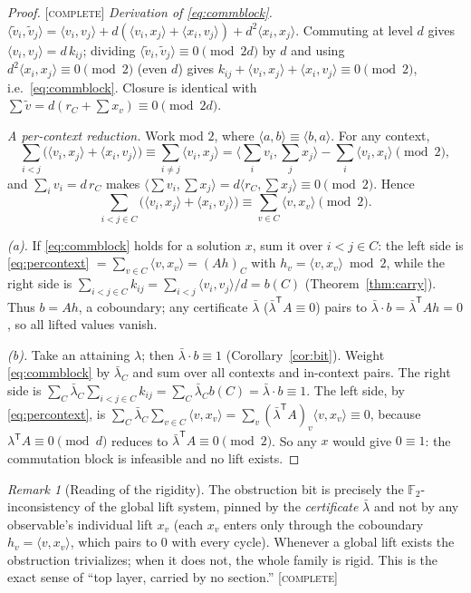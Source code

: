 \documentclass[11pt]{article}
\theoremstyle{definition}
\theoremstyle{remark}
\newtheorem{remark}[theorem]{Remark}
\newcommand{\F}{\mathbb{F}}
\newcommand{\ip}[2]{\langle #1,#2\rangle}
\newcommand{\CO}{\textnormal{\textsc{[complete]}}}
\begin{document}
\begin{proof}
\CO{} \emph{Derivation of \eqref{eq:commblock}.} $\ip{\tilde v_i}{\tilde v_j}=\ip{v_i}{v_j}+d(\ip{v_i}
{x_j}+\ip{x_i}{v_j})+d^2\ip{x_i}{x_j}$. Commuting at level $d$ gives $\ip{v_i}{v_j}=d\,k_{ij}$;
dividing $\ip{\tilde v_i}{\tilde v_j}\equiv0\pmod{2d}$ by $d$ and using $d^2\ip{x_i}{x_j}\equiv0
\pmod{2}$ (even $d$) gives $k_{ij}+\ip{v_i}{x_j}+\ip{x_i}{v_j}\equiv0\pmod2$, i.e.\
\eqref{eq:commblock}. Closure is identical with $\sum\tilde v=d(r_C+\sum x_v)\equiv0\pmod{2d}$.

\emph{A per-context reduction.} Work mod $2$, where $\ip{a}{b}\equiv\ip{b}{a}$. For any context,
\[
\sum_{i<j}\bigl(\ip{v_i}{x_j}+\ip{x_i}{v_j}\bigr)\equiv\sum_{i\ne j}\ip{v_i}{x_j}
=\ip{\textstyle\sum_iv_i}{\textstyle\sum_jx_j}-\sum_i\ip{v_i}{x_i}\pmod2 ,
\]
and $\sum_iv_i=d\,r_C$ makes $\ip{\sum v_i}{\sum x_j}=d\ip{r_C}{\sum x_j}\equiv0\pmod2$. Hence
\begin{equation}\label{eq:percontext}
\sum_{i<j\in C}\bigl(\ip{v_i}{x_j}+\ip{x_i}{v_j}\bigr)\equiv\sum_{v\in C}\ip{v}{x_v}\pmod2 .
\end{equation}

\emph{(a).} If \eqref{eq:commblock} holds for a solution $x$, sum it over $i<j\in C$: the left side is
\eqref{eq:percontext} $=\sum_{v\in C}\ip{v}{x_v}=(Ah)_C$ with $h_v=\ip{v}{x_v}\bmod2$, while the right
side is $\sum_{i<j\in C}k_{ij}=\sum_{i<j}\ip{v_i}{v_j}/d=b(C)$ (Theorem~\ref{thm:carry}). Thus
$b=Ah$, a coboundary; any certificate $\bar\lambda$ ($\bar\lambda^{\mathsf T}A\equiv0$) pairs to
$\bar\lambda\cdot b=\bar\lambda^{\mathsf T}Ah=0$, so all lifted values vanish.

\emph{(b).} Take an attaining $\lambda$; then $\bar\lambda\cdot b\equiv1$
(Corollary~\ref{cor:bit}). Weight \eqref{eq:commblock} by $\bar\lambda_C$ and sum over all contexts
and in-context pairs. The right side is $\sum_C\bar\lambda_C\sum_{i<j\in C}k_{ij}=\sum_C\bar\lambda_C
b(C)=\bar\lambda\cdot b\equiv1$. The left side, by \eqref{eq:percontext}, is
$\sum_C\bar\lambda_C\sum_{v\in C}\ip{v}{x_v}=\sum_v(\bar\lambda^{\mathsf T}A)_v\ip{v}{x_v}\equiv0$,
because $\lambda^{\mathsf T}A\equiv0\pmod d$ reduces to $\bar\lambda^{\mathsf T}A\equiv0\pmod2$. So any
$x$ would give $0\equiv1$: the commutation block is infeasible and no lift exists.
\end{proof}

\begin{remark}[Reading of the rigidity]
The obstruction bit is precisely the $\F_2$-inconsistency of the global lift system, pinned by the
\emph{certificate} $\bar\lambda$ and not by any observable's individual lift $x_v$ (each $x_v$ enters
only through the coboundary $h_v=\ip{v}{x_v}$, which pairs to $0$ with every cycle). Whenever a global
lift exists the obstruction trivializes; when it does not, the whole family is rigid. This is the
exact sense of ``top layer, carried by no section.'' \CO
\end{remark}
\end{document}

